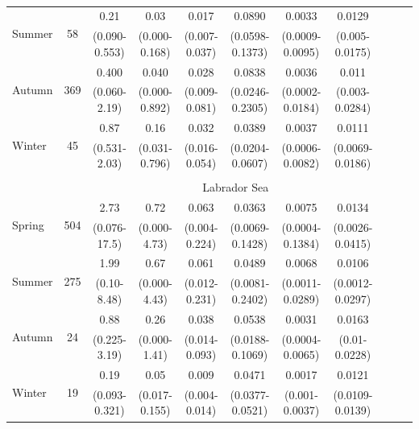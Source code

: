 \documentclass[utf8]{frontiersSCNS} %
\begin{document}
\begin{landscape}
\begin{center}
\begin{table}
\begin{tabular}{ l c c c c c c c c c c}
\multirow{2}{*}{Summer} &   \multirow{2}{*}{58} &0.21   &   0.03    &   0.017   &   0.0890  &   0.0033  &   0.0129  & \\    
    &       &   (0.090-0.553)   &   (0.000-0.168)   &   (0.007-0.037)   &   (0.0598-0.1373) &   (0.0009-0.0095) &   (0.005-0.0175)  & \\    
\multirow{2}{*}{Autumn} &   \multirow{2}{*}{369}    &   0.400   &   0.040   &   0.028   &   0.0838  &   0.0036  &   0.011   & \\
    &       &   (0.060-2.19)    &   (0.000-0.892)   &   (0.009-0.081)   &   (0.0246-0.2305) &   (0.0002-0.0184) &   (0.003-0.0284)  & \\
\multirow{2}{*}{Winter} &   \multirow{2}{*}{45} &   0.87    &   0.16    &   0.032   &   0.0389  &   0.0037  &   0.0111  & \\    
    &       &   (0.531-2.03)    &   (0.031-0.796)   &   (0.016-0.054)   &   (0.0204-0.0607) &   (0.0006-0.0082) &   (0.0069-0.0186) & \\    
    &  & & & & & &  & && \\
 & \multicolumn{10}{c}{\large Labrador Sea} \\
\multirow{2}{*}{Spring} &   \multirow{2}{*}{504}    &2.73   &   0.72    &   0.063   &   0.0363  &   0.0075  &   0.0134  & \\    
    &       &   (0.076-17.5)    &   (0.000-4.73)    &   (0.004-0.224)   &   (0.0069-0.1428) &   (0.0004-0.1384) &   (0.0026-0.0415) & \\    
\multirow{2}{*}{Summer} &   \multirow{2}{*}{275}    &   1.99    &   0.67    &   0.061   &   0.0489  &   0.0068  &   0.0106  & \\
    &       &   (0.10-8.48) &   (0.000-4.43)    &   (0.012-0.231)   &   (0.0081-0.2402) &   (0.0011-0.0289) &   (0.0012-0.0297) & \\
\multirow{2}{*}{Autumn} &   \multirow{2}{*}{24} &   0.88    &   0.26    &   0.038   &   0.0538  &   0.0031  &   0.0163  & \\    
    &       &(0.225-3.19)   &   (0.000-1.41)    &   (0.014-0.093)   &   (0.0188-0.1069) &   (0.0004-0.0065) &   (0.01-0.0228)    & \\
\multirow{2}{*}{Winter} &   \multirow{2}{*}{19} &0.19   &   0.05    &   0.009   &   0.0471  &   0.0017  &   0.0121  & \\    
    &       & (0.093-0.321) &   (0.017-0.155)   &   (0.004-0.014)   &   (0.0377-0.0521) &   (0.001-0.0037)  &   (0.0109-0.0139) & \\
 \hline
\end{tabular}
\caption{}
\label{tab:1}
\end{table}
\end{center}
\end{landscape}
\end{document}
